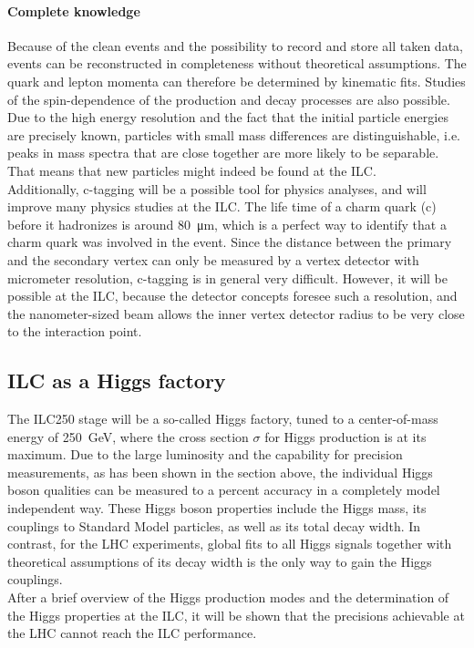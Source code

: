 \paragraph{Complete knowledge}
Because of the clean events and the possibility to record and store all taken data, events can be reconstructed in completeness without theoretical assumptions.
The quark and lepton momenta can therefore be determined by kinematic fits.
Studies of the spin-dependence of the production and decay processes are also possible.\\
Due to the high energy resolution and the fact that the initial particle energies are precisely known, particles with small mass differences are distinguishable, i.e. peaks in mass spectra that are close together are more likely to be separable.
That means that new particles might indeed be found at the ILC.\\
Additionally, c-tagging will be a possible tool for physics analyses, and will improve many physics studies at the ILC.
The life time of a charm quark (c) before it hadronizes is around \SI{80}{\micro\meter}, which is a perfect way to identify that a charm quark was involved in the event.
Since the distance between the primary and the secondary vertex can only be measured by a vertex detector with micrometer resolution, c-tagging is in general very difficult.
However, it will be possible at the ILC, because the detector concepts foresee such a resolution, and the nanometer-sized beam allows the inner vertex detector radius to be very close to the interaction point.

\subsection{ILC as a Higgs factory}
The ILC250 stage will be a so-called Higgs factory, tuned to a center-of-mass energy of \SI{250}{\GeV}, where the cross section $\sigma$ for Higgs production is at its maximum.
Due to the large luminosity and the capability for precision measurements, as has been shown in the section above, the individual Higgs boson qualities can be measured to a percent accuracy in a completely model independent way.
These Higgs boson properties include the Higgs mass, its couplings to Standard Model particles, as well as its total decay width.
In contrast, for the LHC experiments, global fits to all Higgs signals together with theoretical assumptions of its decay width is the only way to gain the Higgs couplings.
\\After a brief overview of the Higgs production modes and the determination of the Higgs properties at the ILC, it will be shown that the precisions achievable at the LHC cannot reach the ILC performance.

